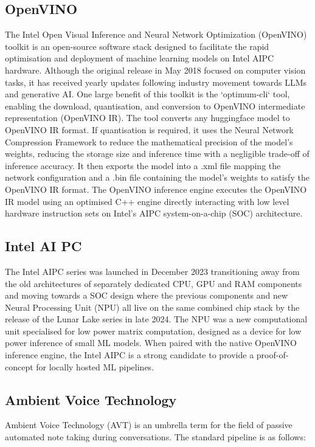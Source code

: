 \subsection{OpenVINO}
The Intel Open Visual Inference and Neural Network Optimization (OpenVINO) toolkit is an open-source software stack designed to facilitate the rapid optimisation and deployment of machine learning models on Intel AIPC hardware\cite{intel_openvino_genai_workflow_2026}. Although the original release in May 2018 focused on computer vision tasks, it has received yearly updates following industry movement towards LLMs and generative AI\cite{intel_openvino_launch_2018}. One large benefit of this toolkit is the `optimum-cli` tool, enabling the download, quantisation, and conversion to OpenVINO intermediate representation (OpenVINO IR)\cite{intel_openvino_gaudi_aipc_2024}. The tool converts any huggingface model to OpenVINO IR format. If quantisation is required, it uses the Neural Network Compression Framework to reduce the mathematical precision of the model's weights, reducing the storage size and inference time with a negligible trade-off of inference accuracy\cite{hybrid_llm_openvino_2024}. It then exports the model into a .xml file mapping the network configuration and a .bin file containing the model's weights to satisfy the OpenVINO IR format. The OpenVINO inference engine executes the OpenVINO IR model using an optimised C++ engine directly interacting with low level hardware instruction sets on Intel's AIPC system-on-a-chip (SOC) architecture\cite{intel_openvino_inference_engine_2023}.

\subsection{Intel AI PC}
The Intel AIPC series was launched in December 2023 transitioning away from the old architectures of separately dedicated CPU, GPU and RAM components and moving towards a SOC design\cite{intel_meteor_lake_2023} where the previous components and new Neural Processing Unit (NPU) all live on the same combined chip stack by the release of the Lunar Lake series in late 2024. The NPU was a new computational unit specialised for low power matrix computation, designed as a device for low power inference of small ML models\cite{intel_lunar_lake_2024}. When paired with the native OpenVINO inference engine, the Intel AIPC is a strong candidate to provide a proof-of-concept for locally hosted ML pipelines\cite{fei2024_nitro_openvino}.

\subsection{Ambient Voice Technology}
Ambient Voice Technology (AVT) is an umbrella term for the field of passive automated note taking during conversations. The standard pipeline is as follows:

